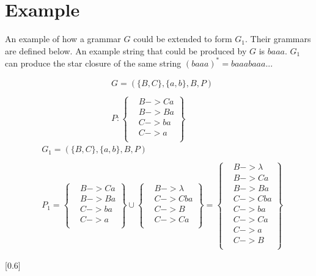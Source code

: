 \documentclass{assignment-x}
\theoremstyle{definition}
\theoremstyle{remark}
\begin{document}
\section{Example}
An example of how a grammar $G$ could be extended to form $G_1$. Their grammars are defined below. An example string that could be produced by $G$ is $baaa$. $G_1$ can produce the star closure of the same string $(baaa)^* = baaabaaa...$


\begin{multicols}{2}
\begin{align*}
    &G  = (\{B,C\},\{a,b\},B,P) \\ \\
    &P:
    \left\{
    \begin{aligned}
    &B -> Ca \\
    &B -> Ba \\
    &C -> ba \\
    &C -> a \\
    \end{aligned}
    \right\}
\end{align*}
\columnbreak
\begin{align*}
    &G_1  = (\{B,C\},\{a,b\},B,P) \\ \\
    &P_1 = 
    \left\{
    \begin{aligned}
    &B -> Ca \\
    &B -> Ba \\
    &C -> ba \\
    &C -> a \\
    \end{aligned}
    \right\} 
    \cup
    \left\{
    \begin{aligned}
    &B -> \lambda \\
    &C -> Cba \\
    &C -> B \\
    &C -> Ca \\
    \end{aligned}
    \right\}
    =
    \left\{
        \begin{aligned}
        &B -> \lambda \\
        &B -> Ca \\
        &B -> Ba \\
        &C -> Cba \\
        &C -> ba \\
        &C -> Ca \\
        &C -> a \\
        &C -> B \\
        \end{aligned}
        \right\}
\end{align*}
\end{multicols}

[0.6\linewidth]
\end{document}
